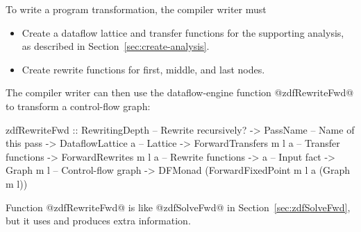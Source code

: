 \documentclass[blockstyle,preprint,natbib,nocopyrightspace]{sigplanconf}
\newcommand\secref[1]{Section~\ref{sec:#1}}
\newcommand\seclabel[1]{\label{sec:#1}}
\begin{document}
To write a program transformation,
the compiler writer must 
\begin{itemize}
\item
Create a dataflow lattice and transfer functions for the supporting
analysis, as described in \secref{create-analysis}. 
\item
Create rewrite functions for first, middle, and last nodes.
\end{itemize}
The
compiler writer can then use the 
dataflow-engine function @zdfRewriteFwd@ to transform a control-flow
graph:
\begin{code}
  zdfRewriteFwd 
    :: RewritingDepth         -- Rewrite recursively?
    -> PassName               -- Name of this pass
    -> DataflowLattice a      -- Lattice
    -> ForwardTransfers m l a -- Transfer functions
    -> ForwardRewrites m l a  -- Rewrite functions
    -> a                      -- Input fact
    -> Graph m l              -- Control-flow graph
    -> DFMonad (ForwardFixedPoint m l a (Graph m l))
\end{code}
Function @zdfRewriteFwd@ is like @zdfSolveFwd@ in
\secref{zdfSolveFwd}, but it uses and produces extra
information.\seclabel{engine-truth} 
\end{document}
